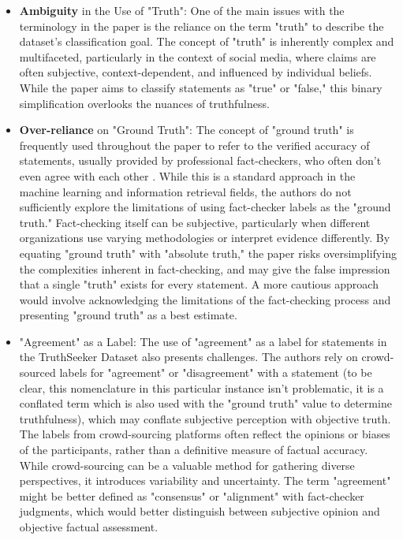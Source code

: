 \documentclass[14]{article}
\begin{document}
\begin{itemize}
    \item \textbf{Ambiguity} in the Use of "Truth": One of the main issues with the terminology in the paper is the reliance on the term "truth" to describe the dataset’s classification goal. The concept of "truth" is inherently complex and multifaceted, particularly in the context of social media, where claims are often subjective, context-dependent, and influenced by individual beliefs. While the paper aims to classify statements as "true" or "false," this binary simplification overlooks the nuances of truthfulness.
    \item \textbf{Over-reliance} on "Ground Truth": The concept of "ground truth" is frequently used throughout the paper to refer to the verified accuracy of statements, usually provided by professional fact-checkers, who often don't even agree with each other \cite{fact_check_fact_checker}. While this is a standard approach in the machine learning and information retrieval fields, the authors do not sufficiently explore the limitations of using fact-checker labels as the "ground truth." Fact-checking itself can be subjective, particularly when different organizations use varying methodologies or interpret evidence differently. By equating "ground truth" with "absolute truth," the paper risks oversimplifying the complexities inherent in fact-checking, and may give the false impression that a single "truth" exists for every statement. A more cautious approach would involve acknowledging the limitations of the fact-checking process and presenting "ground truth" as a best estimate.
    \item "Agreement" as a Label: The use of "agreement" as a label for statements in the TruthSeeker Dataset also presents challenges. The authors rely on crowd-sourced labels for "agreement" or "disagreement" with a statement (to be clear, this nomenclature in this particular instance isn't problematic, it is a conflated term which is also used with the "ground truth" value to determine truthfulness), which may conflate subjective perception with objective truth. The labels from crowd-sourcing platforms often reflect the opinions or biases of the participants, rather than a definitive measure of factual accuracy. While crowd-sourcing can be a valuable method for gathering diverse perspectives, it introduces variability and uncertainty. The term "agreement" might be better defined as "consensus" or "alignment" with fact-checker judgments, which would better distinguish between subjective opinion and objective factual assessment.
\end{itemize}
\end{document}
